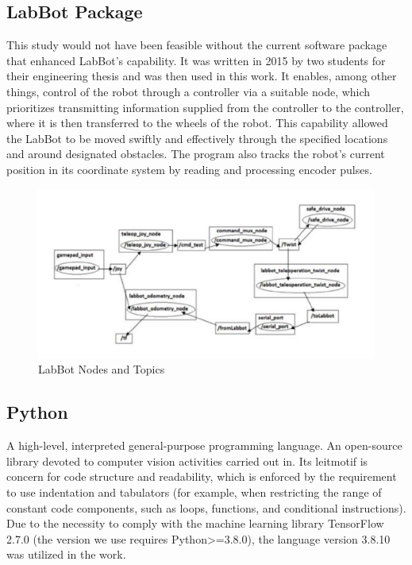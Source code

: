 \documentclass[11pt, a4paper, openany]{book}
\begin{document}
 \subsection{LabBot Package}
 This study would not have been feasible without the current software package that enhanced LabBot's capability. It was written in 2015 by two students for their engineering thesis\cite{Labbot1} and was then used in this work. It enables, among other things, control of the robot through a controller via a suitable node, which prioritizes transmitting information supplied from the controller to the controller, where it is then transferred to the wheels of the robot. This capability allowed the LabBot to be moved swiftly and effectively through the specified locations and around designated obstacles. The program also tracks the robot's current position in its coordinate system by reading and processing encoder pulses.\cite{Githublab}
\begin{figure}[H]
    \centering
    \includegraphics[scale=0.5]{Labbot&ele/14.png}
    \caption{LabBot Nodes and Topics}
    \label{fig:Package} 
\end{figure}
\subsection{Python}
A high-level, interpreted general-purpose programming language. An open-source library devoted to computer vision activities carried out in. Its leitmotif is concern for code structure and readability, which is enforced by the requirement to use indentation and tabulators (for example, when restricting the range of constant code components, such as loops, functions, and conditional instructions). Due to the necessity to comply with the machine learning library TensorFlow 2.7.0 (the version we use requires Python>=3.8.0), the language version 3.8.10 was utilized in the work.
\end{document}
